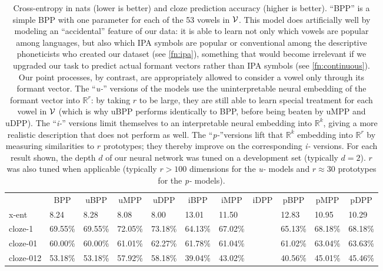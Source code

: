 \documentclass[11pt,a4paper]{article}
\newcommand{\xmark}{\ding{55}}
\begin{document}
\begin{table*}
  \centering
  \begin{adjustbox}{width=2.\columnwidth}
  \begin{tabular}{l|l|lll|lll|lll} \toprule
    & \multicolumn{1}{c|}{BPP}     & \multicolumn{1}{c}{uBPP} & \multicolumn{1}{c}{uMPP} & \multicolumn{1}{c|}{uDPP}     & \multicolumn{1}{c}{iBPP} & \multicolumn{1}{c}{iMPP} & \multicolumn{1}{c|}{iDPP}     & \multicolumn{1}{c}{pBPP} & \multicolumn{1}{c}{pMPP} & \multicolumn{1}{c}{pDPP} \\ \cmidrule(r){2-2} \cmidrule(r){3-5} \cmidrule(r){6-8} \cmidrule(r){9-11}
    { x-ent }    &  8.24    & 8.28     & 8.08  & 8.00    & 13.01 & 11.50 &  \ \ \xmark & 12.83 & 10.95 & 10.29 \\
    { cloze-1}   &  69.55\% & 69.55\%  & 72.05\% & 73.18\% & 64.13\% & 67.02\% &  \ \ \xmark & 65.13\% & 68.18\% & 68.18\%  \\ 
    { cloze-01}  &  60.00\% & 60.00\%   & 61.01\% & 62.27\% & 61.78\% & 61.04\% &  \ \ \xmark & 61.02\% & 63.04\% & 63.63\% \\
    { cloze-012} &  53.18\% & 53.18\%  & 57.92\% & 58.18\% & 39.04\% & 43.02\% &  \ \ \xmark & 40.56\% & 45.01\% & 45.46\% \\
    \bottomrule
  \end{tabular}
  \end{adjustbox}
  \caption{Cross-entropy in nats (lower is better) and cloze prediction accuracy (higher is better). ``BPP'' is a simple BPP with one parameter for each of the 53 vowels in $\cal V$.  This model does artificially well by modeling an ``accidental'' feature of our data: it is able to learn not only which vowels are popular among languages, but also which IPA symbols are popular or conventional among the descriptive phoneticists who created our dataset (see \cref{fn:ipa}), something that would become irrelevant if we upgraded our task to predict actual formant vectors rather than IPA symbols (see \cref{fn:continuous}).  Our point processes, by contrast, are appropriately allowed to consider a vowel only through its formant vector.  The ``{\em u-}'' versions of the models use the uninterpretable neural embedding of the formant vector into $\mathbb{R}^r$: by taking $r$ to be large, they are still able to learn special treatment for each vowel in $\cal V$ (which is why uBPP performs identically to BPP, before being beaten by uMPP and uDPP).  The ``{\em i-}'' versions limit themselves to an interpretable neural embedding into $\mathbb{R}^k$, giving a more realistic description that does not perform as well.  The ``{\em p-}''versions lift that $\mathbb{R}^k$ embedding into $\mathbb{R}^r$ by measuring similarities to $r$ prototypes; they thereby improve on 
    the corresponding {\em i-} versions.  For each result shown, the depth $d$ of our neural network was tuned on a development set (typically $d=2$).  $r$ was also tuned when applicable (typically $r > 100$ dimensions for the {\em u-} models and $r \approx 30$ prototypes for the {\em p-} models).}
  \label{tab:cloze} 
\end{table*} 
\end{document}
